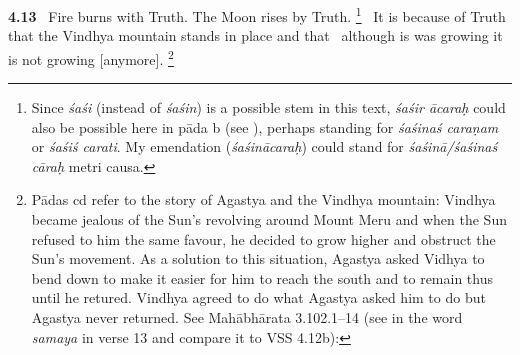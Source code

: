 \documentclass{article}
\newcommand{\skt}[1]{\textit{#1}}
\begin{document}
\textbf{4.13}%
\ Fire burns with Truth. The Moon rises by Truth.%
\footnote{Since \skt{śaśi} (instead of \skt{śaśin}) is a possible stem in this text,                 \skt{śaśir ācaraḥ} could also be possible here in pāda b (see \msNa\msNb\msNc), perhaps standing for                 \skt{śaśinaś caraṇam} or \skt{śaśiś carati}. My emendation (\skt{śaśinācaraḥ})                 could stand for \skt{śaśinā/śaśinaś cāraḥ} metri causa. }%
\ It is because of Truth that the Vindhya mountain stands in place and that%
\                 although is was growing it is not growing [anymore].%
\footnote{

Pādas cd refer to the story of Agastya and the Vindhya mountain:        Vindhya became jealous of the Sun's revolving around Mount Meru and when the Sun         refused to him the same favour, he decided to grow higher and obstruct the Sun's movement.        As a solution to this situation,         Agastya asked Vidhya to bend down to make it easier for him to reach the south and        to remain thus until he retured. Vindhya agreed to do what Agastya asked him to do         but Agastya never returned. See Mahābhārata 3.102.1--14 (see in the word \skt{samaya} in verse 13                and compare it to VSS 4.12b):                

}
\end{document}
